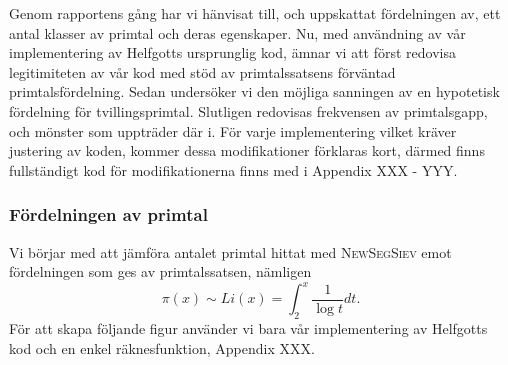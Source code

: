 

Genom rapportens gång har vi hänvisat till, och uppskattat fördelningen av, ett antal klasser av primtal och deras egenskaper. 
Nu, med användning av vår implementering av Helfgotts ursprunglig kod, ämnar vi att först redovisa legitimiteten av vår kod med stöd av primtalssatsens förväntad primtalsfördelning. 
Sedan undersöker vi den möjliga sanningen av en hypotetisk fördelning för tvillingsprimtal. 
Slutligen redovisas frekvensen av primtalsgapp, och mönster som uppträder där i.
För varje implementering vilket kräver justering av koden, kommer dessa modifikationer förklaras kort, därmed finns fullständigt kod för modifikationerna finns med i Appendix XXX - YYY.

\subsubsection{Fördelningen av primtal}\label{app.primes.title}

Vi börjar med att jämföra antalet primtal hittat med \textsc{NewSegSiev} emot fördelningen som ges av primtalssatsen, nämligen
\begin{equation}
    \pi(x) \sim Li(x) = \int_2^x\frac{1}{\log t}dt\label{app.primes.PNT}.
\end{equation}
För att skapa följande figur använder vi bara vår implementering av Helfgotts kod och en enkel räknesfunktion, Appendix XXX.

